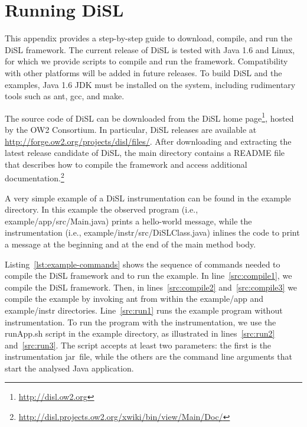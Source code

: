 \documentclass{article}
\newcommand{\brcode}[1]{\textsf{#1}}
\newcommand{\code}[1]{\mbox{\brcode{#1}}}
\begin{document}
\section{Running DiSL}\label{sec:Setup}

This appendix provides a step-by-step guide to download, compile, and run the DiSL framework.
The current release of DiSL is tested with Java 1.6 and Linux, for which we provide scripts to compile and run the framework.
Compatibility with other platforms will be added in future releases.
To build DiSL and the examples, Java 1.6 JDK must be installed on the system,
including rudimentary tools such as \code{ant}, \code{gcc}, and \code{make}.


The source code of DiSL can be downloaded from the DiSL home page\footnote{\url{http://disl.ow2.org}}, hosted by the OW2 Consortium.
In particular, DiSL releases are available at \url{http://forge.ow2.org/projects/disl/files/}.
After downloading and extracting the latest release candidate of DiSL, the main directory contains a \code{README} file that describes how to compile the framework and access additional documentation.\footnote{\url{http://disl.projects.ow2.org/xwiki/bin/view/Main/Doc/}}

\medskip
A very simple example of a DiSL instrumentation can be found in the \code{example} directory.
In this example the observed program (i.e., \code{example/app/src/Main.java}) prints a hello-world message, while the instrumentation (i.e., \code{example/instr/src/DiSLClass.java}) inlines the code to print a message at the beginning and at the end of the main method body.

Listing~\ref{lst:example-commands} shows the sequence of commands needed to compile the DiSL framework and to run the example.
In line~\ref{src:compile1}, we compile the DiSL framework.
Then, in lines~\ref{src:compile2} and~\ref{src:compile3} we compile the example by invoking \code{ant} from within the \code{example/app} and \code{example/instr} directories.
Line~\ref{src:run1} runs the example program without instrumentation.
To run the program with the instrumentation, we use the \code{runApp.sh} script in the \code{example} directory, as illustrated in lines~\ref{src:run2} and~\ref{src:run3}.
The script accepts at least two parameters: the first is the instrumentation jar~file, while the others are the command line arguments that start the analysed Java application.
\end{document}
